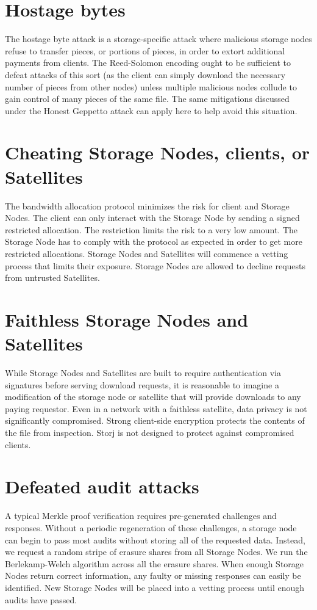 \documentclass[8pt,fleqn,openany]{book}
\begin{document}
\section{Hostage bytes}

The hostage byte attack is a storage-specific attack where malicious storage
nodes
refuse to transfer pieces, or portions of pieces, in order to extort additional
payments from clients. The Reed-Solomon encoding ought to be sufficient to
defeat attacks of this sort (as the client can simply download the necessary
number of pieces from other nodes) unless multiple malicious nodes collude to
gain control of many pieces of the same file. The same mitigations discussed
under the Honest Geppetto attack can apply here to help avoid this situation.

\section{Cheating Storage Nodes, clients, or Satellites}

The bandwidth allocation protocol minimizes the risk for client and Storage
Nodes.
The client can only interact with the Storage Node by sending a signed
restricted allocation.
The restriction limits the risk to a very low amount.
The Storage Node has to comply with the protocol as expected in order to get
more restricted allocations.
Storage Nodes and Satellites will commence a vetting process that limits their
exposure.
Storage Nodes are allowed to decline requests from untrusted Satellites.

\section{Faithless Storage Nodes and Satellites}

While Storage Nodes and Satellites are built to require authentication via
signatures before serving download requests, it is reasonable to imagine a
modification of the storage node or satellite that will provide downloads to
any paying requestor.
Even in a network with a faithless satellite, data privacy is not significantly
compromised.
Strong client-side encryption protects the contents of the file from
inspection.
Storj is not designed to protect against compromised clients.

\section{Defeated audit attacks}

A typical Merkle proof verification requires pre-generated challenges and
responses.
Without a periodic regeneration of these challenges, a storage node can begin
to pass most audits without storing all of the requested data.
Instead, we request a random stripe of erasure shares from all Storage Nodes.
We run the Berlekamp-Welch algorithm\cite{bw} across all the
erasure shares.
When enough Storage Nodes return correct information, any faulty or missing
responses can easily be identified.
New Storage Nodes will be placed into a vetting process until enough audits
have passed.

\newpage

\begingroup
\raggedright

\endgroup
\end{document}

